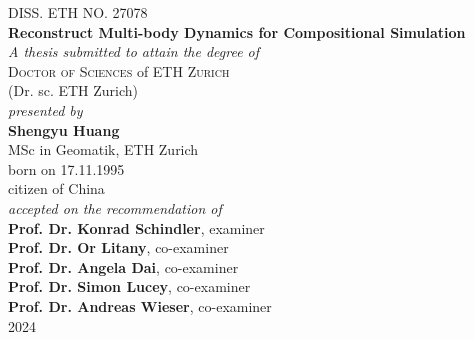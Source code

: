 
\begin{center}
	\large{DISS. ETH NO. 27078}\\
\vspace{2 cm}
	\Large{\textbf{Reconstruct Multi-body Dynamics for Compositional Simulation}}\\
\vspace{2 cm}
	\large{\emph{A thesis submitted to attain the degree of}}\\
\vspace{0.5cm}
	\large{\textsc{Doctor of Sciences} of \textsc{ETH Zurich}}\\
\vspace{0.5cm}
	\large{(Dr. sc. ETH Zurich)}\\
\vspace{2cm}
	\large{\emph{presented by}}\\
\vspace{0.5cm}
	\large{\textbf{Shengyu Huang}}\\
\vspace{0.3cm}
	\large{MSc in Geomatik, ETH Zurich}\\
\vspace{0.3cm}
	\large{born on 17.11.1995}\\
\vspace{0.3cm}
	\large{citizen of China}\\
\vspace{2cm}
	\large{\emph{accepted on the recommendation of}}\\
\vspace{0.5cm}
	\large{\textbf{Prof. Dr. Konrad Schindler}, examiner %
}\\
\vspace{0.1cm}
	\large{\textbf{Prof. Dr. Or Litany}, co-examiner %
}\\
\vspace{0.1cm}
	\large{\textbf{Prof. Dr. Angela Dai}, co-examiner %
}\\
\vspace{0.1cm}
	\large{\textbf{Prof. Dr. Simon Lucey}, co-examiner %
}\\
\vspace{0.1cm}
	\large{\textbf{Prof. Dr. Andreas Wieser}, co-examiner %
}\\

\vspace{2cm}
	\large{2024}
\end{center}


